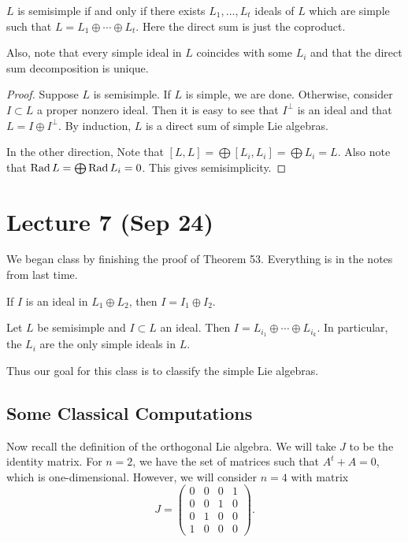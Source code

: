 \documentclass[twoside, 10pt]{article}
\begin{document}
    \begin{thm}
        $L$ is semisimple if and only if there exists $L_1, \ldots, L_t$ ideals of $L$ which are simple such that $L = L_1 \oplus \cdots \oplus L_t$. Here the direct sum is just the coproduct.
    \end{thm}

    Also, note that every simple ideal in $L$ coincides with some $L_i$ and that the direct sum decomposition is unique.

    \begin{proof}
        Suppose $L$ is semisimple. If $L$ is simple, we are done. Otherwise, consider $I \subset L$ a proper nonzero ideal. Then it is easy to see that $I^{\perp}$ is an ideal and that $L = I \oplus I^{\perp}$. By induction, $L$ is a direct sum of simple Lie algebras.

        In the other direction, Note that $[L,L] = \bigoplus [L_i,L_i] = \bigoplus L_i = L$. Also note that $\operatorname{Rad} L = \bigoplus \operatorname{Rad} L_i = 0$. This gives semisimplicity.
    \end{proof}

    \section{Lecture 7 (Sep 24)}%
    \label{sec:lecture_7_sep_24_}
    
    We began class by finishing the proof of Theorem 53. Everything is in the notes from last time.

    \begin{rmk}
        If $I$ is an ideal in $L_1 \oplus L_2$, then $I = I_1 \oplus I_2$.
    \end{rmk}

    \begin{rmk}
        Let $L$ be semisimple and $I \subset L$ an ideal. Then $I = L_{i_1} \oplus \cdots \oplus L_{i_k}.$ In particular, the $L_i$ are the only simple ideals in $L$.
    \end{rmk}

    Thus our goal for this class is to classify the simple Lie algebras.
        
    \subsection{Some Classical Computations}%
    \label{sub:classical_lie_algebras}
    
    Now recall the definition of the orthogonal Lie algebra. We will take $J$ to be the identity matrix. For $n = 2$, we have the set of matrices such that $A^t+A = 0$, which is one-dimensional. However, we will consider $n=4$ with matrix
    \[ J = \begin{pmatrix}
        0 & 0 & 0 & 1 \\
        0 & 0 & 1 & 0 \\
        0 & 1 & 0 & 0 \\
        1 & 0 & 0 & 0
    \end{pmatrix}. \]
\end{document}
